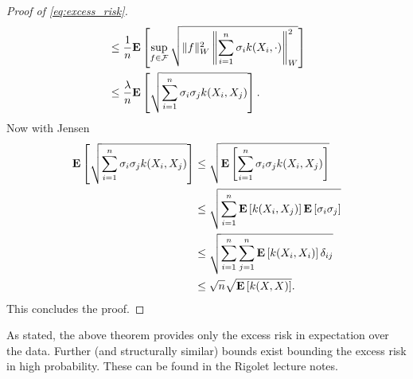 \begin{proof}[Proof of \autoref{eq:excess_risk}]
\begin{align*}
	& \leq \frac{1}{n} \mathbf{E} \left[\sup_{f \in \mathcal{F}} \sqrt{\|f\|_W^2 \left\|\sum_{i=1}^n \sigma_i k(X_i, \cdot) \right\|_W^2}\right] \\ 
	& \leq \frac{\lambda}{n}\mathbf{E} \left[\sqrt{\sum_{i=1}^n \sigma_i\sigma_j k(X_i, X_j)}\right]. 
\end{align*}
Now with Jensen
\begin{align*}
	\mathbf{E} \left[\sqrt{\sum_{i=1}^n \sigma_i\sigma_j k(X_i, X_j)}\right] &\leq  \sqrt{\mathbf{E} \left[\sum_{i=1}^n \sigma_i\sigma_j k(X_i, X_j)\right]} \\ 
	&\leq  \sqrt{\sum_{i=1}^n \mathbf{E}\left[k(X_i, X_j)\right] \mathbf{E} \left[\sigma_i\sigma_j \right]} \\ 
	&\leq  \sqrt{\sum_{i=1}^n\sum_{j=1}^n\mathbf{E}\left[k(X_i, X_i)\right] \delta_{ij}} \\
	&\leq \sqrt{n}\sqrt{\mathbf{E}\left[k(X, X)\right]}.
\end{align*}
This concludes the proof.
\end{proof}
As stated, the above theorem provides only the excess risk in expectation over the data. Further (and structurally similar) bounds exist bounding the excess risk in high probability. These can be found in the Rigolet lecture notes. 
